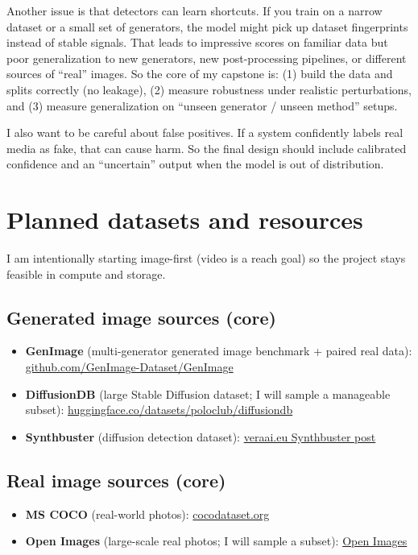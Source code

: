 \documentclass[11pt]{article}
\begin{document}
Another issue is that detectors can learn shortcuts. If you train on a narrow dataset or a small set of generators, the model might pick up dataset fingerprints instead of stable signals. That leads to impressive scores on familiar data but poor generalization to new generators, new post-processing pipelines, or different sources of “real” images. So the core of my capstone is: (1) build the data and splits correctly (no leakage), (2) measure robustness under realistic perturbations, and (3) measure generalization on “unseen generator / unseen method” setups.

I also want to be careful about false positives. If a system confidently labels real media as fake, that can cause harm. So the final design should include calibrated confidence and an “uncertain” output when the model is out of distribution.

\section{Planned datasets and resources}

I am intentionally starting image-first (video is a reach goal) so the project stays feasible in compute and storage.

\subsection*{Generated image sources (core)}
\begin{itemize}[leftmargin=1.4em]
  \item \textbf{GenImage} (multi-generator generated image benchmark + paired real data): \href{https://github.com/GenImage-Dataset/GenImage}{github.com/GenImage-Dataset/GenImage}
  \item \textbf{DiffusionDB} (large Stable Diffusion dataset; I will sample a manageable subset): \href{https://huggingface.co/datasets/poloclub/diffusiondb}{huggingface.co/datasets/poloclub/diffusiondb}
  \item \textbf{Synthbuster} (diffusion detection dataset): \href{https://www.veraai.eu/posts/dataset-synthbuster-towards-detection-of-diffusion-model-generated-images}{veraai.eu Synthbuster post}
\end{itemize}

\subsection*{Real image sources (core)}
\begin{itemize}[leftmargin=1.4em]
  \item \textbf{MS COCO} (real-world photos): \href{https://cocodataset.org/}{cocodataset.org}
  \item \textbf{Open Images} (large-scale real photos; I will sample a subset): \href{https://storage.googleapis.com/openimages/web/index.html}{Open Images}
\end{itemize}
\end{document}
